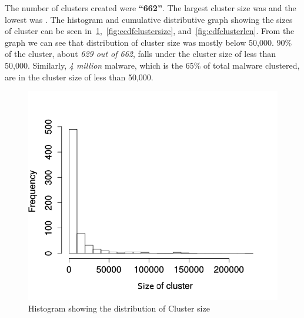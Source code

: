 The number of clusters created were \textbf{``662''}.
The largest cluster size was {\getlargestclustersize{}} and the lowest was {\getlowestclustersize{}}.
The histogram and cumulative distributive graph showing the sizes of cluster can be seen in~\ref{fig:histclustersize},~\ref{fig:ecdfclustersize}, and~\ref{fig:cdfclusterlen}.
From the graph we can see that distribution of cluster size was mostly below 50,000.
$90\%$ of the cluster, about \emph{629 out of 662}, falls under the cluster size of less than 50,000.
Similarly, \emph{4 million} malware, which is the $65\%$ of total malware clustered, are in the cluster size of less than 50,000.\\
\begin{figure}[htbp]
\begin{center}
  \includegraphics[scale=0.5]{figures/histclustersize_new.png}
\end{center}
\caption{Histogram showing the distribution of Cluster size}
\label{fig:histclustersize}
\end{figure}
